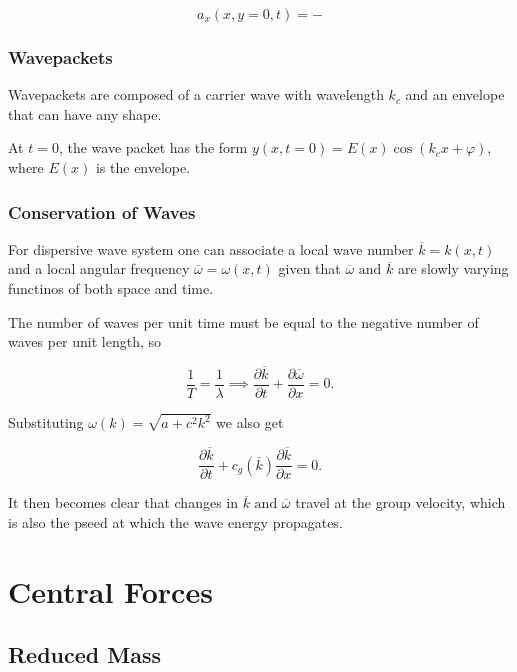 \documentclass[a4paper,12pt]{report}
\begin{document}
\begin{equation}
	a_{x}(x,y=0,t) = - 
\end{equation}

\subsection{Wavepackets}

Wavepackets are composed of a carrier wave with wavelength \(k_{c} \) and an envelope that can have any shape. 

At \(t=0\), the wave packet has the form \(y(x,t=0) = E(x)\cos (k_{c}x+\varphi  )\), where \(E(x)\) is the envelope.   

\subsection{Conservation of Waves}

For dispersive wave system one can associate a local wave number \(\overline{k} = k(x,t)\) and a local angular frequency \(\overline{\omega } = \omega (x,t)\) given that \(\overline{\omega } \text { and } \overline{k} \) are slowly varying functinos of both space and time. 

The number of waves per unit time must be equal to the negative number of waves per unit length, so 

\begin{equation}
	\frac{1}{T} = \frac{1}{\lambda } \implies \frac{\partial \overline{k} }{\partial t} + \frac{\partial \overline{\omega } }{\partial x} = 0.    
\end{equation}

Substituting \(\omega (k) = \sqrt{a+c^2k^2} \) we also get

\begin{equation}
	\frac{\partial \overline{k} }{\partial t} + c_{g}(\overline{k} )\frac{\partial \overline{k} }{\partial x} = 0.   
\end{equation}

It then becomes clear that changes in \(\overline{k} \text { and } \overline{\omega }  \) travel at the group velocity, which is also the pseed at which the wave energy propagates. 



\chapter{Central Forces}

\section{Reduced Mass}
\end{document}
